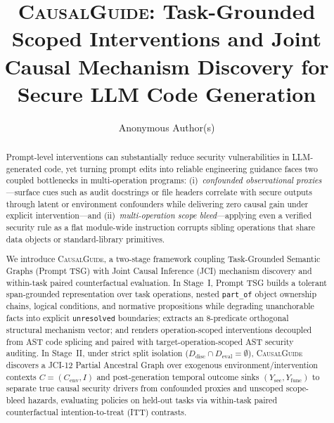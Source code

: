 \documentclass[manuscript,screen,review,anonymous]{acmart}
\newcommand{\model}{\textsc{CausalGuide}\xspace}
\newcommand{\prompttsg}{Prompt TSG\xspace}
\begin{document}
\title[CausalGuide: Scoped Causal Prompt Guidance for Secure LLM Code Generation]{\model: Task-Grounded Scoped Interventions and Joint Causal Mechanism Discovery for Secure LLM Code Generation}

\author{Anonymous Author(s)}

\begin{abstract}
Prompt-level interventions can substantially reduce security vulnerabilities in
LLM-generated code, yet turning prompt edits into reliable engineering
guidance faces two coupled bottlenecks in multi-operation programs:
(i)~\emph{confounded observational proxies}---surface cues such as audit
docstrings or file headers correlate with secure outputs through latent or
environment confounders while delivering zero causal gain under explicit
intervention---and (ii)~\emph{multi-operation scope bleed}---applying even a
verified security rule as a flat module-wide instruction corrupts sibling
operations that share data objects or standard-library primitives.

We introduce \model, a two-stage framework coupling Task-Grounded Semantic
Graphs (\prompttsg) with Joint Causal Inference (JCI) mechanism discovery and
within-task paired counterfactual evaluation. In Stage~I, \prompttsg builds a
tolerant span-grounded representation over task operations, nested
\texttt{part\_of} object ownership chains, logical conditions, and normative
propositions while degrading unanchorable facts into explicit
\texttt{unresolved} boundaries; extracts an 8-predicate orthogonal structural
mechanism vector; and renders operation-scoped interventions decoupled from
AST code splicing and paired with target-operation-scoped AST security
auditing. In Stage~II, under strict split isolation
($D_{\mathrm{disc}} \cap D_{\mathrm{eval}} = \emptyset$), \model discovers a
JCI-12 Partial Ancestral Graph over exogenous environment/intervention contexts
$C=(C_{\mathrm{env}}, I)$ and post-generation temporal outcome sinks
$(Y_{\mathrm{sec}}, Y_{\mathrm{func}})$ to separate true causal security drivers
from confounded proxies and unscoped scope-bleed hazards, evaluating policies on
held-out tasks via within-task paired counterfactual intention-to-treat (ITT)
contrasts.


\end{abstract}
\end{document}

